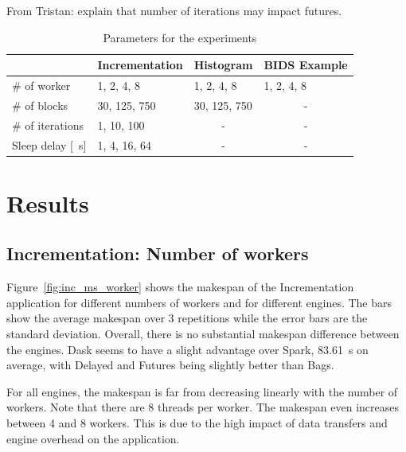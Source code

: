 \documentclass[conference]{IEEEtran}
\newcommand{\TG}[1]{\color{cyan}From Tristan: #1 \color{black}}
\begin{document}
\TG{explain that number of iterations may impact futures.}


\begin{table}[!t]
    \renewcommand{\arraystretch}{1.3}
    \caption{Parameters for the experiments}\label{tab:param}
    \centering
    \begin{tabular*}{\columnwidth}{llll}
    \hline
                        & Incrementation & Histogram             & BIDS Example          \\ \hline
    \# of worker        & 1, 2, 4, 8     & 1, 2, 4, 8            & 1, 2, 4, 8            \\
    \# of blocks        & 30, 125, 750   & 30, 125, 750          & \multicolumn{1}{c}{-} \\
    \# of iterations    & 1, 10, 100     & \multicolumn{1}{c}{-} & \multicolumn{1}{c}{-} \\
    Sleep delay {[}\SI{}{\second}{]} & 1, 4, 16, 64   & \multicolumn{1}{c}{-} & \multicolumn{1}{c}{-} \\ \hline
    \end{tabular*}
    \end{table}






\section{Results}

\subsection{Incrementation: Number of workers}
Figure~\ref{fig:inc_ms_worker} shows the makespan of the Incrementation application
for different numbers of workers and for different engines. The bars show the average
makespan over 3 repetitions while the error bars are the standard deviation. Overall,
there is no substantial makespan difference between the engines. Dask seems to have a
slight advantage over Spark, \SI{83.61}{\second} on average,
with Delayed and Futures being slightly better than Bags.

For all engines, the makespan is far from decreasing linearly with the
number of workers. Note that there are 8 threads per worker. The makespan
even increases between 4 and 8 workers. This is due to the high impact of
data transfers and engine overhead on the application. 
\end{document}
